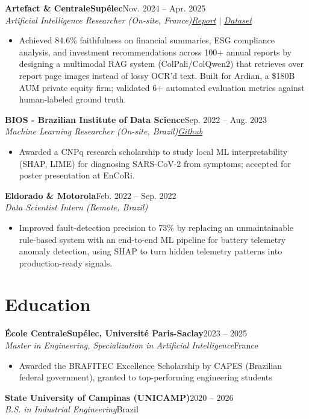 \documentclass[10pt,letterpaper]{article}
\newcommand{\entry}[4]{%
  \textbf{#1}\hfill #2\\[-1pt]
  \textit{#3}\hfill #4\par\vspace{1pt}}
\newenvironment{bul}{\begin{itemize}[leftmargin=1.5em,label=--,itemsep=0pt,topsep=1pt,parsep=0pt]}{\end{itemize}}
\begin{document}
\entry{Artefact \& CentraleSup\'elec}{Nov. 2024 -- Apr. 2025}{Artificial Intelligence Researcher (On-site, France)}{\href{https://github.com/LucasTramonte/OpenFinanceAI/blob/main/Assets/report/final_report.pdf}{\textit{Report}} $|$ \href{https://huggingface.co/datasets/artefactory/Argimi-Ardian-Finance-10k-text}{\textit{Dataset}}}
\begin{bul}
\item Achieved 84.6\% faithfulness on financial summaries, ESG compliance analysis, and investment recommendations across 100+ annual reports by designing a multimodal RAG system (ColPali/ColQwen2) that retrieves over report page images instead of lossy OCR'd text. Built for Ardian, a \$180B AUM private equity firm; validated 6+ automated evaluation metrics against human-labeled ground truth.
\end{bul}

\entry{BIOS - Brazilian Institute of Data Science}{Sep. 2022 -- Aug. 2023}{Machine Learning Researcher (On-site, Brazil)}{\href{https://github.com/LucasTramonte/SARS-CoV-2-Prediction-based-on-symptoms}{\textit{Github}}}
\begin{bul}
\item Awarded a CNPq research scholarship to study local ML interpretability (SHAP, LIME) for diagnosing SARS-CoV-2 from symptoms; accepted for poster presentation at EnCoRi.
\end{bul}

\entry{Eldorado \& Motorola}{Feb. 2022 -- Sep. 2022}{Data Scientist Intern (Remote, Brazil)}{}
\begin{bul}
\item Improved fault-detection precision to 73\% by replacing an unmaintainable rule-based system with an end-to-end ML pipeline for battery telemetry anomaly detection, using SHAP to turn hidden telemetry patterns into production-ready signals.
\end{bul}

\section{Education}
\small
\entry{\'Ecole CentraleSup\'elec, Universit\'e Paris-Saclay}{2023 -- 2025}{Master in Engineering, Specialization in Artificial Intelligence}{France}
\begin{bul}
\item Awarded the BRAFITEC Excellence Scholarship by CAPES (Brazilian federal government), granted to top-performing engineering students
\end{bul}
\entry{State University of Campinas (UNICAMP)}{2020 -- 2026}{B.S. in Industrial Engineering}{Brazil}
\end{document}
